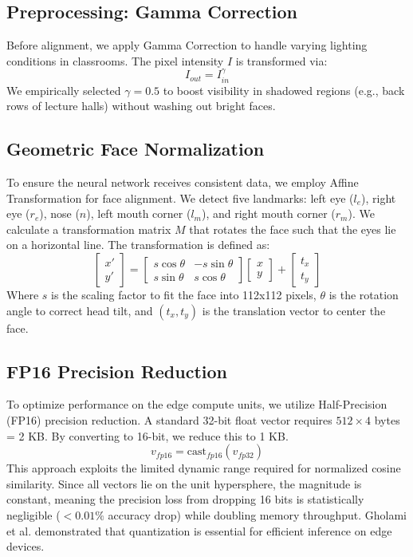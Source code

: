 \documentclass[conference]{IEEEtran}
\begin{document}
\subsection{Preprocessing: Gamma Correction}
Before alignment, we apply Gamma Correction to handle varying lighting conditions in classrooms. The pixel intensity $I$ is transformed via:
\begin{equation}
I_{out} = I_{in}^\gamma
\end{equation}
We empirically selected $\gamma = 0.5$ to boost visibility in shadowed regions (e.g., back rows of lecture halls) without washing out bright faces.

\subsection{Geometric Face Normalization}
To ensure the neural network receives consistent data, we employ Affine Transformation for face alignment. We detect five landmarks: left eye ($l_e$), right eye ($r_e$), nose ($n$), left mouth corner ($l_m$), and right mouth corner ($r_m$).
We calculate a transformation matrix $M$ that rotates the face such that the eyes lie on a horizontal line. The transformation is defined as:
\begin{equation}
\begin{bmatrix} x' \\ y' \end{bmatrix} = \begin{bmatrix} s \cos \theta & -s \sin \theta \\ s \sin \theta & s \cos \theta \end{bmatrix} \begin{bmatrix} x \\ y \end{bmatrix} + \begin{bmatrix} t_x \\ t_y \end{bmatrix}
\end{equation}
Where $s$ is the scaling factor to fit the face into 112x112 pixels, $\theta$ is the rotation angle to correct head tilt, and $(t_x, t_y)$ is the translation vector to center the face.

\subsection{FP16 Precision Reduction}
To optimize performance on the edge compute units, we utilize Half-Precision (FP16) precision reduction. A standard 32-bit float vector requires $512 \times 4$ bytes = 2 KB. By converting to 16-bit, we reduce this to 1 KB.
\begin{equation}
v_{fp16} = \text{cast}_{fp16}(v_{fp32})
\end{equation}
This approach exploits the limited dynamic range required for normalized cosine similarity. Since all vectors lie on the unit hypersphere, the magnitude is constant, meaning the precision loss from dropping 16 bits is statistically negligible ($< 0.01\%$ accuracy drop) while doubling memory throughput. Gholami et al. \cite{b14} demonstrated that quantization is essential for efficient inference on edge devices.
\end{document}
